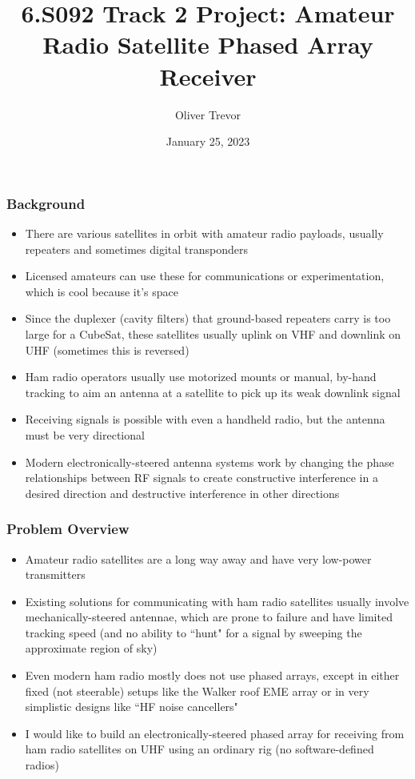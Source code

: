 \documentclass{beamer}
\title{6.S092 Track 2 Project: Amateur Radio Satellite Phased Array Receiver}
\author{Oliver Trevor}
\institute{MIT}
\date{January 25, 2023}
\begin{document}
    \frame{\titlepage}

    \begin{frame}
        \frametitle{Background}

        \begin{itemize}
            \item There are various satellites in orbit with amateur radio payloads, usually repeaters and sometimes digital transponders

            \item Licensed amateurs can use these for communications or experimentation, which is cool because it's space

            \item Since the duplexer (cavity filters) that ground-based repeaters carry is too large for a CubeSat, these satellites usually uplink on VHF and downlink on UHF (sometimes this is reversed)

            \item Ham radio operators usually use motorized mounts or manual, by-hand tracking to aim an antenna at a satellite to pick up its weak downlink signal

            \item Receiving signals is possible with even a handheld radio, but the antenna must be very directional

            \item Modern electronically-steered antenna systems work by changing the phase relationships between RF signals to create constructive interference in a desired direction and destructive interference in other directions
        \end{itemize}

    \end{frame}

    \begin{frame}
        \frametitle{Problem Overview}
        \begin{itemize}
            \item Amateur radio satellites are a long way away and have very low-power transmitters

            \item Existing solutions for communicating with ham radio satellites usually involve mechanically-steered antennae, which are prone to failure and have limited tracking speed (and no ability to ``hunt" for a signal by sweeping the approximate region of sky)

            \item Even modern ham radio mostly does not use phased arrays, except in either fixed (not steerable) setups like the Walker roof EME array or in very simplistic designs like ``HF noise cancellers"

            \item I would like to build an electronically-steered phased array for receiving from ham radio satellites on UHF using an ordinary rig (no software-defined radios)
        \end{itemize}
    \end{frame}
\end{document}
